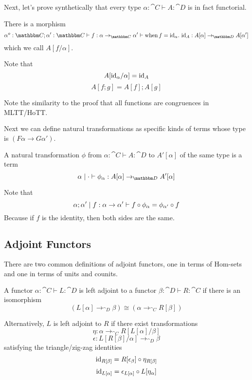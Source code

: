 \documentclass{article}
\begin{document}
Next, let's prove synthetically that every type $\alpha : \cat C
\vdash A : \cat D$ is in fact functorial.
\begin{definition}
  There is a morphism
  \[ \alpha^o:\cat C;\alpha':\cat C \vdash f : \alpha \to_{\cat C} \alpha' \vdash
  \when f = \id_{\alpha}.~ \id_{A} : A[\alpha] \to_{\cat D} A[\alpha']
  \]
  which we call $A[f/\alpha]$.

  Note that
  \[ A[\textrm{id}_\alpha/\alpha] = \textrm{id}_{A} \]
  \[ A[f;g] = A[f];A[g] \]
\end{definition}
Note the similarity to the proof that all functions are congruences in
MLTT/HoTT.

Next we can define natural transformations as specific kinds of
terms whose type is $(F \alpha \to G \alpha')$.
\begin{definition}
  A natural transformation $\phi$ from $\alpha : \cat C \vdash A : \cat D$ to
  $A'[\alpha]$ of the same type is a term
  \[ \alpha\pipe \cdot \vdash \phi_\alpha : A[\alpha] \to_{\cat D} A'[\alpha] \]

  Note that
  \[ \alpha;\alpha' \mathrel{|} f : \alpha \to \alpha' \vdash
  f \circ \phi_{\alpha} = \phi_{\alpha'} \circ f
  \]
  Because if $f$ is the identity, then both sides are the same.
\end{definition}

\subsection{Adjoint Functors}

There are two common definitions of adjoint functors, one in terms of
Hom-sets and one in terms of units and counits.

\begin{definition}
  A functor $\alpha : \cat C \vdash L : \cat D$ is left adjoint to a
  functor $\beta : \cat D \vdash R : \cat C$ if there is an isomorphism
  \[ (L[\alpha] \to_{\cat D} \beta) \cong (\alpha \to_{\cat C} R[\beta]) \]

  Alternatively, $L$ is left adjoint to $R$ if there exist
  transformations
  \[ \eta : \alpha \to_{\cat C} R[L[\alpha]/\beta] \] %
  \[ \epsilon : L[R[\beta]/\alpha] \to_{\cat D} \beta  \] %
  satisfying the triangle/zig-zag identities
  \[ \textrm{id}_{R[\beta]} = R[\epsilon_{\beta}] \circ \eta_{R[\beta]} \]
  \[ \textrm{id}_{L[\alpha]} = \epsilon_{L[\alpha]} \circ L[\eta_{\alpha}] \]
\end{definition}
\end{document}
